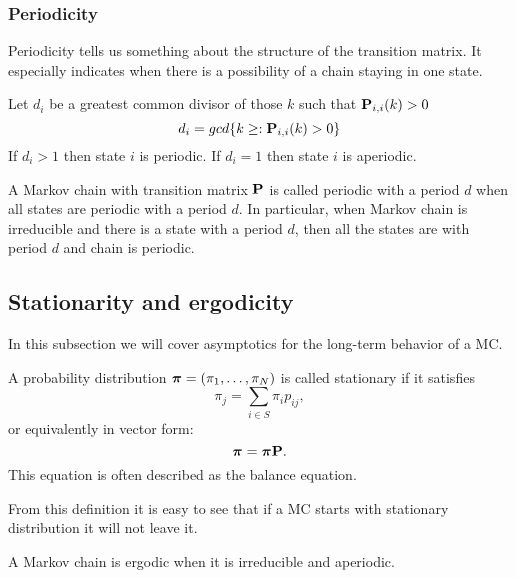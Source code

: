 	\subsubsection{Periodicity}
		Periodicity tells us something about the structure of the transition matrix. It especially indicates when there is a possibility of a chain staying in one state.
		\begin{definition}[Periodicity]
			Let $d_i$ be a greatest common divisor of those $k$ such that $\mathbf{P}_{i,i}(k)>0$ \ie
			\begin{equation*}
				d_i = gcd\{ k \geq : \mathbf{P}_{i,i}(k)>0 \}
			\end{equation*}
			If $d_i > 1$ then state $i$ is periodic. If $d_i = 1$ then state $i$ is aperiodic.
		\end{definition}
	
		\begin{definition}
			A Markov chain with transition matrix $\mathbf{P}$ is called periodic with a period $d$ when all states are periodic with a period $d$. In particular, when Markov chain is irreducible and there is a state with a period $d$, then all the states are with period $d$ and chain is periodic.
		\end{definition}	
	

\subsection{Stationarity and ergodicity}
	In this subsection we will cover asymptotics for the long-term behavior of a MC.
	\begin{definition}[Stationarity]
		A probability distribution $\boldsymbol{\pi} = (\pi_1, \ldots, \pi_N)$ is called stationary if it satisfies
		\begin{equation*}
			\pi_j = \sum_{i \in S} \pi_i p_{ij},
		\end{equation*}
		or equivalently in vector form:
		\begin{equation*}
			\boldsymbol{\pi} = \boldsymbol{\pi} \mathbf{P}.
		\end{equation*}
		This equation is often described as the balance equation.
	\end{definition}
	From this definition it is easy to see that if a MC starts with stationary distribution it will not leave it. 
	
	\begin{definition}[Ergodicity]
		A Markov chain is ergodic when it is irreducible and aperiodic.
	\end{definition}
	
